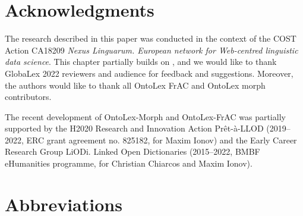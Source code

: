 \documentclass[output=paper,colorlinks,citecolor=brown]{langscibook}
\begin{document}
\section*{Acknowledgments}
The research described in this paper was
conducted
in the context of the COST Action CA18209 \emph{Nexus Linguarum. European network for Web-centred linguistic data science}.
This chapter partially builds on \citet{chiarcos2022modelling, chiarcos2022modellingGlobalex}, and we would like to thank GlobaLex 2022 reviewers and audience for feedback and suggestions. Moreover, the authors would like to thank all OntoLex FrAC and OntoLex morph contributors.

The recent development of OntoLex-Morph and OntoLex-FrAC was partially supported by the H2020 Research and Innovation Action Prêt-à-LLOD (2019--2022, ERC grant agreement no. 825182, for Maxim Ionov) and the Early Career Research Group LiODi. Linked Open Dictionaries (2015--2022, BMBF eHumanities programme, for Christian Chiarcos and Maxim Ionov).


\section*{Abbreviations}
\end{document}
